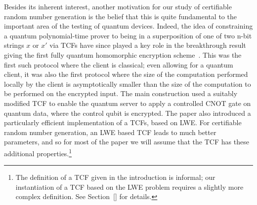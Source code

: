 \documentclass[11pt]{article}
\theoremstyle{remark}
\theoremstyle{definition}
\begin{document}
Besides its inherent interest, another motivation for our study of certifiable random number generation is the belief that this is quite fundamental to the important area 
of the testing of quantum devices. Indeed, the idea of constraining a quantum polynomial-time prover to being in a superposition of one of two n-bit strings $x$ or $x'$ via TCFs have since played a key role in the breakthrough result giving the first fully quantum homomorphic encryption scheme~\cite{}. This was the first such protocol where the client is classical; even allowing for a quantum client, it was also the first protocol where the size of the computation performed locally by the client is asymptotically smaller than the size of the computation to be performed on the encrypted input. The main construction used a
suitably modified TCF to enable the quantum server to apply a controlled CNOT gate on quantum data, where the control qubit is encrypted. The paper also 
introduced a particularly efficient implementation of a TCFs, based on LWE. For certifiable random number generation, an LWE based TCF
leads to much better parameters, and so for most of the paper we will assume that the TCF has these additional properties.\footnote{The definition of a TCF given in the introduction is informal; our instantiation of a TCF based on the LWE problem requires a slightly more complex definition. See Section~\ref{} for details.} 
 
\end{document}
